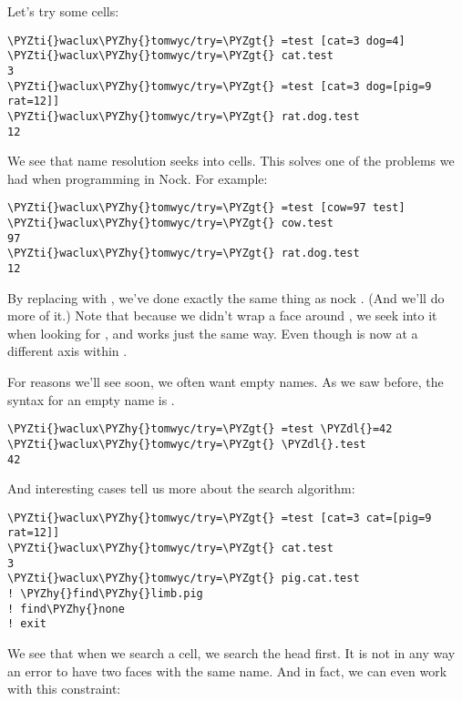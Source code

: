 Let's try some cells:

\begin{framed_shaded}
\begin{Verbatim}[fontsize=\relsize{-2.5},fontseries=b,commandchars=\\\{\}]
\PYZti{}waclux\PYZhy{}tomwyc/try=\PYZgt{} =test [cat=3 dog=4]
\PYZti{}waclux\PYZhy{}tomwyc/try=\PYZgt{} cat.test
3
\PYZti{}waclux\PYZhy{}tomwyc/try=\PYZgt{} =test [cat=3 dog=[pig=9 rat=12]]
\PYZti{}waclux\PYZhy{}tomwyc/try=\PYZgt{} rat.dog.test
12
\end{Verbatim}
\end{framed_shaded}
We see that name resolution seeks into cells.  This solves one of
the problems we had when programming in Nock.  For example:

\begin{framed_shaded}
\begin{Verbatim}[fontsize=\relsize{-2.5},fontseries=b,commandchars=\\\{\}]
\PYZti{}waclux\PYZhy{}tomwyc/try=\PYZgt{} =test [cow=97 test]
\PYZti{}waclux\PYZhy{}tomwyc/try=\PYZgt{} cow.test
97
\PYZti{}waclux\PYZhy{}tomwyc/try=\PYZgt{} rat.dog.test
12
\end{Verbatim}
\end{framed_shaded}
By replacing  with \kode{[cow=97 test]}, we've done exactly the
same thing as nock .  (And we'll do more of it.)  Note that
because we didn't wrap a face around , we seek into it when
looking for , and  works just the same way.
Even though  is now at a different axis within .

For reasons we'll see soon, we often want empty names.  As we saw
before, the syntax for an empty name is \kode{\$}.

\begin{framed_shaded}
\begin{Verbatim}[fontsize=\relsize{-2.5},fontseries=b,commandchars=\\\{\}]
\PYZti{}waclux\PYZhy{}tomwyc/try=\PYZgt{} =test \PYZdl{}=42
\PYZti{}waclux\PYZhy{}tomwyc/try=\PYZgt{} \PYZdl{}.test
42
\end{Verbatim}
\end{framed_shaded}
And interesting cases tell us more about the search algorithm:

\begin{framed_shaded}
\begin{Verbatim}[fontsize=\relsize{-2.5},fontseries=b,commandchars=\\\{\}]
\PYZti{}waclux\PYZhy{}tomwyc/try=\PYZgt{} =test [cat=3 cat=[pig=9 rat=12]]
\PYZti{}waclux\PYZhy{}tomwyc/try=\PYZgt{} cat.test
3
\PYZti{}waclux\PYZhy{}tomwyc/try=\PYZgt{} pig.cat.test
! \PYZhy{}find\PYZhy{}limb.pig
! find\PYZhy{}none
! exit
\end{Verbatim}
\end{framed_shaded}
We see that when we search a cell, we search the head first.  It
is not in any way an error to have two faces with the same name.
And in fact, we can even work with this constraint:

